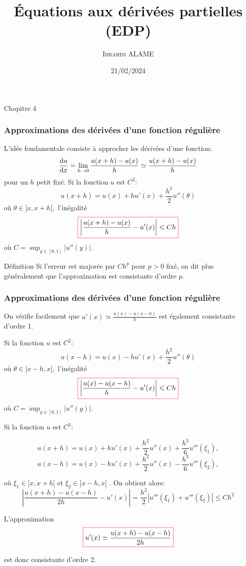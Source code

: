 \documentclass{beamer}
\title{Équations aux dérivées partielles (EDP)}
\author{ \textsc{Ibrahim ALAME}}\institute{ESTP}
\date{21/02/2024}
\def \de {{\rm d}}
\newcommand{\myredbox}[1]{\fcolorbox{red}{white}{$\displaystyle#1$}}
\begin{document}
 \begin{frame}
 \begin{center}
 Chapitre 4
 \end{center}
  \titlepage
  \end{frame}


 


\begin{frame}
\frametitle{Approximations des dérivées d'une fonction régulière}
 L'idée fondamentale consiste à approcher les dérivées d'une fonction:
\[\frac{\de u}{\de x} =\lim_{h\to 0} \frac{u(x+h)-u(x)}{h}\simeq  \frac{u(x+h)-u(x)}{h} \]
pour un $h$ petit fixé. 
 Si la fonction $u$ est $C^2$:
\[u(x+h)=u(x)+h u'(x)+\frac{h^2}2 u''(\theta) \]
où $\theta \in ]x, x + h[,$ l'inégalité
\[\myredbox{\left|\frac{u(x+h)-u(x)}h- u'(x)\right| \leqslant C h }\]
 où $C = \sup_{y\in [0,1]} |u''(y)|$.
\begin{block}{Définition}
Si l'erreur est majorée par $C h^p$ pour $p > 0$ fixé, on dit plus généralement que l'approximation est consistante d'ordre $p$.
\end{block}


\end{frame}

\begin{frame}
\frametitle{Approximations des dérivées d'une fonction régulière}
On vérifie facilement que $u'(x) \simeq \frac{u(x) - u(x - h)}h$
est également consistante d'ordre 1.

 Si la fonction $u$ est $C^2$:
\[u(x-h)=u(x)-h u'(x)+\frac{h^2}2 u''(\theta) \]
où $\theta \in ]x-h, x[,$ l'inégalité
\[\myredbox{\left|\frac{u(x)-u(x-h)}h- u'(x)\right| \leqslant C h }\]
 où $C = \sup_{y\in [0,1]} |u''(y)|$.



\end{frame}


\begin{frame}


Si la fonction $u$ est $C^3$:

\[u(x+h)=u(x)+h u'(x)+\frac{h^2}2 u''(x)+\frac{h^3}6 u'''(\xi_1) ,\]
\[u(x-h)=u(x)-h u'(x)+\frac{h^2}2 u''(x)-\frac{h^3}6 u'''(\xi_2) ,\]

où $\xi_1\in ]x,x+h[$ et $\xi_2\in ]x-h,x[$ . On obtient alors:
\[\left| \frac{u(x+h)-u(x-h)}{2h}- u'(x) \right|=\frac{h^2}{2}\left| u'''(\xi_1)+u'''(\xi_2) \right|  \leqslant C h^2 \]

 L'approximation
\[\myredbox{u'(x)\simeq \frac{u(x+h)-u(x-h)}{2h}}\] 
 
est donc consistante d'ordre 2.
\end{frame}
\end{document}
